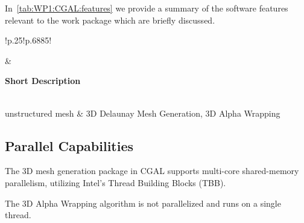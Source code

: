 In~\cref{tab:WP1:CGAL:features} we provide a summary of the software features relevant to the work package which are briefly discussed.

\begin{table}[h!]
    \centering
    { 
        \setlength{\parindent}{0pt}
        \def\arraystretch{1.25}
        {
            \fontsize{9}{11}\selectfont
            \begin{tabular}{!{\color{numpexgray}\vrule}p{.25\linewidth}!{\color{numpexgray}\vrule}p{.6885\linewidth}!{\color{numpexgray}\vrule}}
    
     &  {\rule{0pt}{2.5ex}\color{white}\bf Short Description }\\ 
    
    unstructured mesh & 3D Delaunay Mesh Generation, 3D Alpha Wrapping \\
\end{tabular}
        }
    }
    \caption{WP1: CGAL Features}
    \label{tab:WP1:CGAL:features}
\end{table}


\subsection{Parallel Capabilities}
\label{sec:WP1:CGAL:performances}



The 3D mesh generation package in CGAL supports multi-core shared-memory parallelism, 
utilizing Intel's Thread Building Blocks (TBB).

The 3D Alpha Wrapping algorithm is not parallelized and runs on a single thread.

